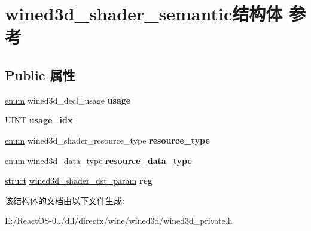 \hypertarget{structwined3d__shader__semantic}{}\section{wined3d\+\_\+shader\+\_\+semantic结构体 参考}
\label{structwined3d__shader__semantic}
\subsection*{Public 属性}
\begin{DoxyCompactItemize}
\item 
\mbox{\label{structwined3d__shader__semantic_a3e6c03ec0518179c84267b2548f6237c}} 
\hyperlink{interfaceenum}{enum} wined3d\+\_\+decl\+\_\+usage {\bfseries usage}
\item 
\mbox{\label{structwined3d__shader__semantic_ae9a5033556fa9fbf54ab568497bd543f}} 
U\+I\+NT {\bfseries usage\+\_\+idx}
\item 
\mbox{\label{structwined3d__shader__semantic_abb25ae392ea276a056cf5c5be3b535e8}} 
\hyperlink{interfaceenum}{enum} wined3d\+\_\+shader\+\_\+resource\+\_\+type {\bfseries resource\+\_\+type}
\item 
\mbox{\label{structwined3d__shader__semantic_ab8f0a0cff184ad7eb7f7c776aa4b134e}} 
\hyperlink{interfaceenum}{enum} wined3d\+\_\+data\+\_\+type {\bfseries resource\+\_\+data\+\_\+type}
\item 
\mbox{\label{structwined3d__shader__semantic_a3ce4faa9ab709eec1bf4e4423b4c0fce}} 
\hyperlink{interfacestruct}{struct} \hyperlink{structwined3d__shader__dst__param}{wined3d\+\_\+shader\+\_\+dst\+\_\+param} {\bfseries reg}
\end{DoxyCompactItemize}


该结构体的文档由以下文件生成\+:\begin{DoxyCompactItemize}
\item 
E\+:/\+React\+O\+S-\/0../dll/directx/wine/wined3d/wined3d\+\_\+private.\+h\end{DoxyCompactItemize}
